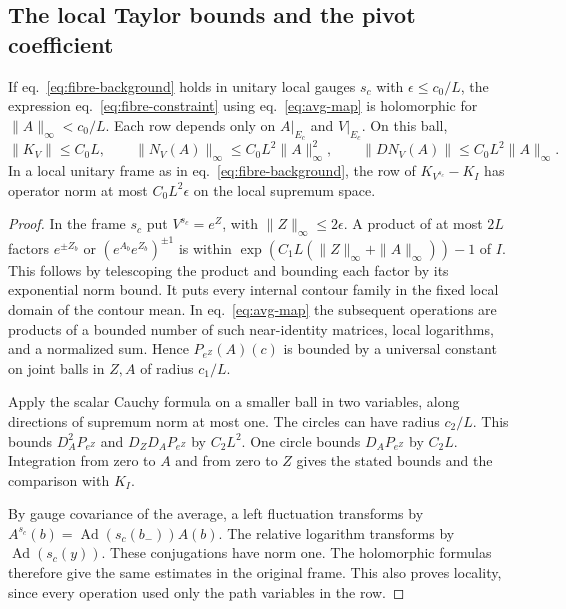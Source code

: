 \documentclass[11pt,letterpaper,reqno]{amsart}
\makeatletter
\numberwithin{equation}{section}
\renewcommand{\eqref}[1]{\textup{eq.~\ref{#1}}}
\theoremstyle{definition}
\newcommand{\ms@minorstart}{%
  \pushQED{\qed}\renewcommand{\qedsymbol}{$\blacksquare$}}
\newenvironment{lemma}[1][]{\ms@minorstart\ms@lemma[#1]}
  {\popQED\endms@lemma}
\theoremstyle{remark}
\makeatother
\begin{document}
\subsection{The local Taylor bounds and the pivot coefficient}\label{sec:fibre-pivot}

\begin{lemma}[Taylor bounds in physical bond logarithms]\label{lem:fibre-taylor}
If \eqref{eq:fibre-background} holds in unitary local gauges
\(s_c\) with $\epsilon\le c_0/L$, the expression
\eqref{eq:fibre-constraint} using \eqref{eq:avg-map} is holomorphic for
$\|A\|_\infty<c_0/L$. Each row depends only on $A|_{E_c}$ and $V|_{E_c}$. On
this ball,
\begin{equation}\label{eq:fibre-remainder}
 \|K_V\|\le C_0 L,\qquad
 \|N_V(A)\|_\infty\le C_0 L^2\|A\|_\infty^2,\qquad
 \|DN_V(A)\|\le C_0 L^2\|A\|_\infty.
\end{equation}
In a local unitary frame as in \eqref{eq:fibre-background}, the row of
$K_{V^{s_c}}-K_I$ has operator norm at most $C_0 L^2\epsilon$ on the local
supremum space.
\end{lemma}

\begin{proof}
In the frame $s_c$ put $V^{s_c}=e^Z$, with $\|Z\|_\infty\le 2\epsilon$. A
product of at most $2L$ factors $e^{\pm Z_b}$ or $(e^{A_b}e^{Z_b})^{\pm1}$ is
within $\exp(C_1 L(\|Z\|_\infty+\|A\|_\infty))-1$ of $I$. This follows by
telescoping the product and bounding each factor by its exponential norm
bound. It puts every internal contour family in the fixed local domain of the
contour mean. In \eqref{eq:avg-map} the subsequent operations are products of
a bounded number of such near-identity matrices, local logarithms, and a
normalized sum. Hence \(P_{e^Z}(A)(c)\) is bounded by a universal constant on
joint balls in \(Z,A\) of radius \(c_1/L\).

Apply the scalar Cauchy formula on a smaller ball in two variables,
along directions of supremum norm at most one. The circles can
have radius \(c_2/L\). This bounds \(D_A^2P_{e^Z}\) and
\(D_ZD_AP_{e^Z}\) by \(C_2L^2\). One circle bounds \(D_AP_{e^Z}\)
by \(C_2L\). Integration from zero to \(A\) and from zero to \(Z\)
gives the stated bounds and the comparison with \(K_I\).

By gauge covariance of the average, a left fluctuation transforms by
$A^{s_c}(b)=\operatorname{Ad}(s_c(b_-))A(b)$. The relative logarithm
transforms by $\operatorname{Ad}(s_c(y))$. These conjugations have norm one.
The holomorphic formulas therefore give the same estimates in the original
frame. This also proves locality, since every operation used only the path
variables in the row.
\end{proof}
\end{document}
